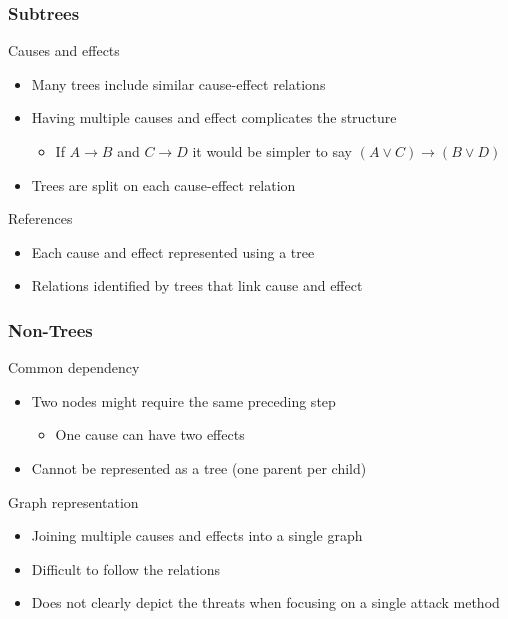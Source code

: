 \begin{frame}\frametitle{Subtrees}
  \begin{block}{Causes and effects}
    \begin{itemize}
      \item Many trees include similar cause-effect relations
      \item Having multiple causes and effect complicates the structure
      \begin{itemize}
        \item If $A \rightarrow B$ and $C \rightarrow D$ it would be simpler to say $(A \vee C) \rightarrow (B \vee D)$
      \end{itemize}
      \item Trees are split on each cause-effect relation
    \end{itemize}
  \end{block}
  \begin{block}{References}
    \begin{itemize}
      \item Each cause and effect represented using a tree
      \item Relations identified by trees that link cause and effect
    \end{itemize}
  \end{block}
\end{frame}



\begin{frame}\frametitle{Non-Trees}
  \begin{block}{Common dependency}
    \begin{itemize}
      \item Two nodes might require the same preceding step
      \begin{itemize}
        \item One cause can have two effects
      \end{itemize}
      \item Cannot be represented as a tree (one parent per child)
    \end{itemize}
  \end{block}
  \begin{block}{Graph representation}
    \begin{itemize}
      \item Joining multiple causes and effects into a single graph
      \item Difficult to follow the relations
      \item Does not clearly depict the threats when focusing on a single attack method
    \end{itemize}
  \end{block}
\end{frame}

